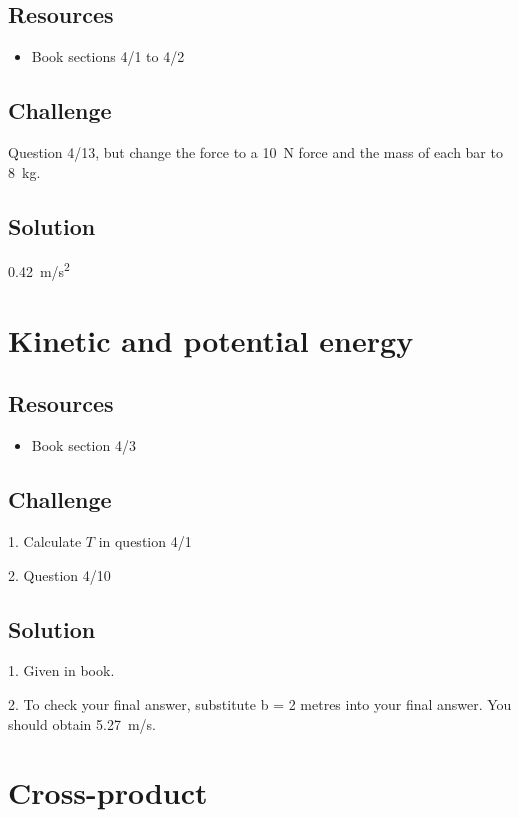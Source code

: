 \subsection*{Resources}
\begin{itemize}
    \item Book sections 4/1 to 4/2
\end{itemize}

\subsection*{Challenge}
Question 4/13, but change the force to a \SI{10}{N} force and the mass of each bar to \SI{8}{kg}.

\subsection*{Solution}
\SI{0.42}{m/s^2}




\newpage
\section{Kinetic and potential energy}

\subsection*{Resources}
\begin{itemize}
    \item Book section 4/3
\end{itemize}

\subsection*{Challenge}
1. Calculate $T$ in question 4/1

2. Question 4/10

\subsection*{Solution}
1. Given in book.

2. To check your final answer, substitute b = 2 metres into your final answer. You should obtain \SI{5.27}{m/s}.



\iffalse
\newpage
\section{Cross-product}

